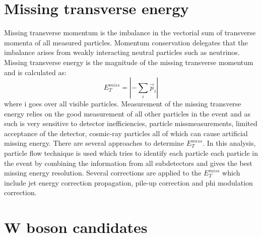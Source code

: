 
\section{Missing transverse energy}

Missing transverse momentum is the imbalance in the vectorial sum of transverse momenta of all measured particles. Momentum conservation delegates that the imbalance arises from weakly interacting neutral particles such as neutrinos. Missing transverse energy is the magnitude of the missing transverse momentum and is calculated as:
\begin{equation}
E_T^{miss}= |-\sum_{i} \vec{p}_i|
\end{equation}
where i goes over all visible particles. Measurement of the missing transverse energy relies on the good measurement of all other particles in the event and as such is very sensitive to detector inefficiencies, particle missmeasurements, limited acceptance of the detector, cosmic-ray particles all of which can cause artificial missing energy. There are several approaches to determine $E_T^{miss}$. In this analysis, particle flow technique is used which tries to identify each particle each particle in the event by combining the information from all subdetectors and gives the best missing energy resolution.\cite{CMS-PAS-PFT-09-001,Chatrchyan:2011tn} Several corrections are applied to the $E_T^{miss}$ which include jet energy correction propagation, pile-up correction and phi modulation correction. 


\section{W boson candidates}


